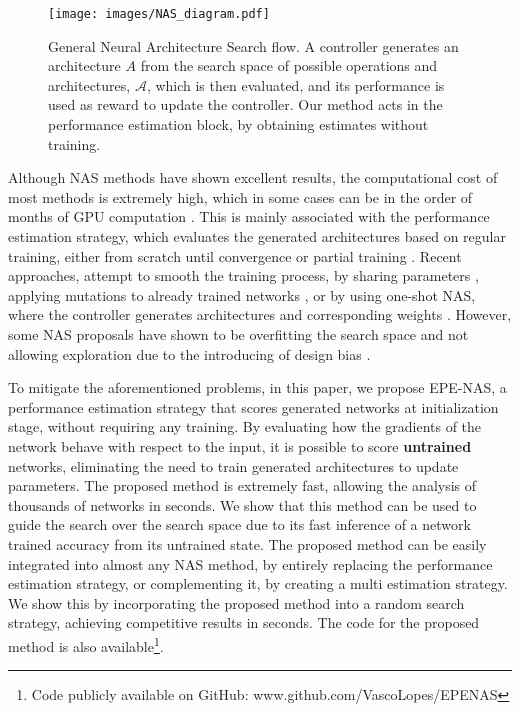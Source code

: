 \documentclass[10pt, conference]{IEEEtran}
\begin{document}
\begin{figure}[!t]
    \centering
    \texttt{[image: images/NAS\_diagram.pdf]}
    \caption{General Neural Architecture Search flow. A controller generates an architecture $A$ from the search space of possible operations and architectures, $\mathcal{A}$, which is then evaluated, and its performance is used as reward to update the controller. Our method acts in the performance estimation block, by obtaining estimates without training. \label{fig:nasdiagram}}
\end{figure}

Although NAS methods have shown excellent results, the computational cost of most methods is extremely high, which in some cases can be in the order of months of GPU computation \cite{DBLP:conf/iclr/ZophL17, liu2018progressive, Zoph_2018}. This is mainly associated with the performance estimation strategy, which evaluates the generated architectures based on regular training, either from scratch until convergence or partial training \cite{runge2018learning, real2019aging}. Recent approaches, attempt to smooth the training process, by sharing parameters \cite{pham2018efficient}, applying mutations to already trained networks \cite{DBLP:conf/iclr/ElskenMH19}, or by using one-shot NAS, where the controller generates architectures and corresponding weights \cite{DBLP:conf/iclr/LiuSY19, DBLP:conf/iclr/CaiZH19, DBLP:conf/iclr/ZelaESMBH20}. However, some NAS proposals have shown to be overfitting the search space and not allowing exploration due to the introducing of design bias \cite{Yang2020NAS}.


To mitigate the aforementioned problems, in this paper, we propose EPE-NAS, a performance estimation strategy that scores generated networks at initialization stage, without requiring any training. By evaluating how the gradients of the network behave with respect to the input, it is possible to score \textbf{untrained} networks, eliminating the need to train generated architectures to update parameters. The proposed method is extremely fast, allowing the analysis of thousands of networks in seconds. We show that this method can be used to guide the search over the search space due to its fast inference of a network trained accuracy from its untrained state. The proposed method can be easily integrated into almost any NAS method, by entirely replacing the performance estimation strategy, or complementing it, by creating a multi estimation strategy. We show this by incorporating the proposed method into a random search strategy, achieving competitive results in seconds. The code for the proposed method is also available\footnote{Code publicly available on GitHub: www.github.com/VascoLopes/EPENAS}.
\end{document}
